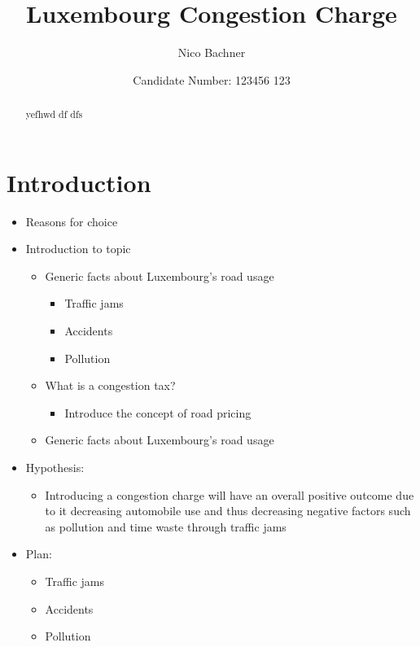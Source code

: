 \documentclass[
  a4paper,
  12pt,
]{article}
\title{
    Luxembourg Congestion Charge
      }
\author{
          Nico Bachner
        }
\date{Candidate Number: 123456 123}
\providecommand{\tightlist}{
  \setlength{\itemsep}{0pt}
  \setlength{\parskip}{0pt}
}
\begin{document}
\maketitle

  \begin{abstract}
    yefhwd df dfs
  \end{abstract}

\newpage




\maketitle
\thispagestyle{empty}
\newpage
\tableofcontents
\newpage

\hypertarget{introduction}{%
\section{Introduction}\label{introduction}}

\begin{itemize}
\tightlist
\item
  Reasons for choice
\item
  Introduction to topic

  \begin{itemize}
  \tightlist
  \item
    Generic facts about Luxembourg's road usage

    \begin{itemize}
    \tightlist
    \item
      Traffic jams
    \item
      Accidents
    \item
      Pollution
    \end{itemize}
  \item
    What is a congestion tax?

    \begin{itemize}
    \tightlist
    \item
      Introduce the concept of road pricing
    \end{itemize}
  \item
    Generic facts about Luxembourg's road usage
  \end{itemize}
\item
  Hypothesis:

  \begin{itemize}
  \tightlist
  \item
    Introducing a congestion charge will have an overall positive
    outcome due to it decreasing automobile use and thus decreasing
    negative factors such as pollution and time waste through traffic
    jams
  \end{itemize}
\item
  Plan:

  \begin{itemize}
  \tightlist
  \item
    Traffic jams
  \item
    Accidents
  \item
    Pollution
  \end{itemize}
\end{itemize}
\end{document}
